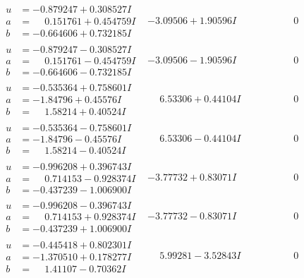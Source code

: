 \documentclass[1p]{elsarticle_modified}
\theoremstyle{definition}
\begin{document}
$$\begin{array}{c|c|c}
\begin{aligned}
u &= -0.879247 + 0.308527 I \\
a &= \phantom{-}0.151761 + 0.454759 I \\
b &= -0.664606 + 0.732185 I\end{aligned}
 & -3.09506 + 1.90596 I & \phantom{-0.000000 } 0 \\ \hline\begin{aligned}
u &= -0.879247 - 0.308527 I \\
a &= \phantom{-}0.151761 - 0.454759 I \\
b &= -0.664606 - 0.732185 I\end{aligned}
 & -3.09506 - 1.90596 I & \phantom{-0.000000 } 0 \\ \hline\begin{aligned}
u &= -0.535364 + 0.758601 I \\
a &= -1.84796 + 0.45576 I \\
b &= \phantom{-}1.58214 + 0.40524 I\end{aligned}
 & \phantom{-}6.53306 + 0.44104 I & \phantom{-0.000000 } 0 \\ \hline\begin{aligned}
u &= -0.535364 - 0.758601 I \\
a &= -1.84796 - 0.45576 I \\
b &= \phantom{-}1.58214 - 0.40524 I\end{aligned}
 & \phantom{-}6.53306 - 0.44104 I & \phantom{-0.000000 } 0 \\ \hline\begin{aligned}
u &= -0.996208 + 0.396743 I \\
a &= \phantom{-}0.714153 - 0.928374 I \\
b &= -0.437239 - 1.006900 I\end{aligned}
 & -3.77732 + 0.83071 I & \phantom{-0.000000 } 0 \\ \hline\begin{aligned}
u &= -0.996208 - 0.396743 I \\
a &= \phantom{-}0.714153 + 0.928374 I \\
b &= -0.437239 + 1.006900 I\end{aligned}
 & -3.77732 - 0.83071 I & \phantom{-0.000000 } 0 \\ \hline\begin{aligned}
u &= -0.445418 + 0.802301 I \\
a &= -1.370510 + 0.178277 I \\
b &= \phantom{-}1.41107 - 0.70362 I\end{aligned}
 & \phantom{-}5.99281 - 3.52843 I & \phantom{-0.000000 } 0 \\ \hline\begin{aligned}

\end{aligned}
\end{array}$$
\end{document}
